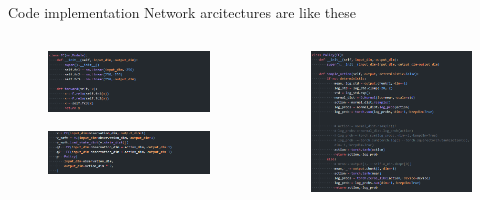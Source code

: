 \documentclass[8pt]{beamer}
\begin{document}
\begin{frame}{Code implementation}
    Network arcitectures are like these
    \begin{columns}[t]
        \begin{column}{0.5\textwidth}            
            \begin{figure}
                \centering
                \includegraphics[width=1.0\textwidth]{FCnn.png}
            \end{figure}
            \begin{figure}
                \centering
                \includegraphics[width=1.0\textwidth]{NetworkArchitectures.png}
            \end{figure}
        \end{column}
        \begin{column}{0.5\textwidth}
            \begin{figure}
                \centering
                \includegraphics[width=1.0\textwidth]{NotCoVPolicy.png}
            \end{figure}
        \end{column}
    \end{columns}
\end{frame}
\end{document}
